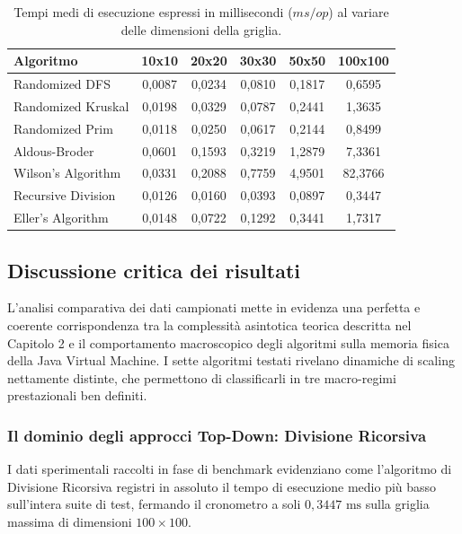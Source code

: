 \documentclass[12pt, a4paper]{article}
\begin{document}
	\begin{table}[h!]
		\centering
		\begin{tabular}{lccccc}
			\hline
			\textbf{Algoritmo} & \textbf{10x10} & \textbf{20x20} & \textbf{30x30} & \textbf{50x50} & \textbf{100x100} \\ \hline
			Randomized DFS      & 0,0087 & 0,0234 & 0,0810 & 0,1817 & 0,6595 \\
			Randomized Kruskal  & 0,0198 & 0,0329 & 0,0787 & 0,2441 & 1,3635 \\
			Randomized Prim     & 0,0118 & 0,0250 & 0,0617 & 0,2144 & 0,8499 \\
			Aldous-Broder       & 0,0601 & 0,1593 & 0,3219 & 1,2879 & 7,3361 \\
			Wilson's Algorithm  & 0,0331 & 0,2088 & 0,7759 & 4,9501 & 82,3766 \\
			Recursive Division  & 0,0126 & 0,0160 & 0,0393 & 0,0897 & 0,3447 \\
			Eller's Algorithm   & 0,0148 & 0,0722 & 0,1292 & 0,3441 & 1,7317 \\ \hline
		\end{tabular}
		\caption{Tempi medi di esecuzione espressi in millisecondi ($ms/op$) al variare delle dimensioni della griglia.}
		\label{tab:risultati_benchmark}
	\end{table}
	
	\subsection{Discussione critica dei risultati}
	L'analisi comparativa dei dati campionati mette in evidenza una perfetta e coerente corrispondenza tra la complessità asintotica teorica descritta nel Capitolo 2 e il comportamento macroscopico degli algoritmi sulla memoria fisica della Java Virtual Machine. I sette algoritmi testati rivelano dinamiche di scaling nettamente distinte, che permettono di classificarli in tre macro-regimi prestazionali ben definiti.
	
	\subsubsection{Il dominio degli approcci Top-Down: Divisione Ricorsiva}
	I dati sperimentali raccolti in fase di benchmark evidenziano come l'algoritmo di Divisione Ricorsiva registri in assoluto il tempo di esecuzione medio più basso sull'intera suite di test, fermando il cronometro a soli $0,3447\text{ ms}$ sulla griglia massima di dimensioni $100\times100$. 
	
\end{document}
